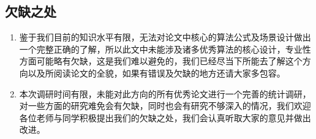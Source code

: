 \documentclass[conference]{IEEEtran}
\begin{document}
\subsection{欠缺之处}%

\begin{enumerate}
    \item 鉴于我们目前的知识水平有限，无法对论文中核心的算法公式及场景设计做出一个完整正确的了解，所以此文中未能涉及诸多优秀算法的核心设计，专业性方面可能略有欠缺，这是我们难以避免的，我们已经尽当下所能去了解这个方向以及所阅读论文的全貌，如果有错误及欠缺的地方还请大家多包容。
    \item 本次调研时间有限，未能对此方向的所有优秀论文进行一个完善的统计调研，对一些方面的研究难免会有欠缺，同时也会有研究不够深入的情况，我们欢迎各位老师与同学积极提出我们的欠缺之处，我们会认真听取大家的意见并做出改进。
\end{enumerate}



\end{document}
